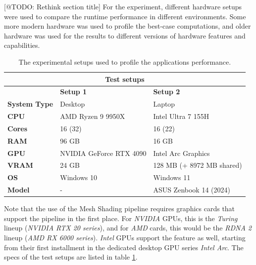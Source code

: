 [@TODO: Rethink section title]
For the experiment, different hardware setups were used to compare the runtime performance in different environments.
Some more modern hardware was used to profile the best-case computations, and older hardware was used for the results 
to different versions of hardware features and capabilities.

\begin{table}[h]          %
    \begin{tabular}{|lll|}
        \hline
        \multicolumn{3}{|c|}{\textbf{Test setups}}                                                                              \\ \hline
        \multicolumn{1}{|l|}{}                     & \multicolumn{1}{l|}{\textbf{Setup 1}}          & \textbf{Setup 2}          \\ \hline
        \multicolumn{1}{|l|}{\textbf{System Type}} & \multicolumn{1}{l|}{Desktop}                   & Laptop                    \\
        \multicolumn{1}{|l|}{\textbf{CPU}}         & \multicolumn{1}{l|}{AMD Ryzen 9 9950X}         & Intel Ultra 7 155H        \\
        \multicolumn{1}{|l|}{\textbf{Cores}}       & \multicolumn{1}{l|}{16 (32)}                   & 16 (22)                   \\
        \multicolumn{1}{|l|}{\textbf{RAM}}         & \multicolumn{1}{l|}{96 GB}                     & 16 GB                     \\
        \multicolumn{1}{|l|}{\textbf{GPU}}         & \multicolumn{1}{l|}{NVIDIA GeForce RTX 4090}   & Intel Arc Graphics        \\
        \multicolumn{1}{|l|}{\textbf{VRAM}}        & \multicolumn{1}{l|}{24 GB}                     & 128 MB (+ 8972 MB shared) \\
        \multicolumn{1}{|l|}{\textbf{OS}}          & \multicolumn{1}{l|}{Windows 10}                & Windows 11                \\
        \multicolumn{1}{|l|}{\textbf{Model}}       & \multicolumn{1}{l|}{-}                         & ASUS Zenbook 14 (2024)    \\ \hline
    \end{tabular}
    \caption{The experimental setups used to profile the applications performance.}
    \label{tbl:hardware-setup}
\end{table}

\noindent
Note that the use of the Mesh Shading pipeline requires graphics cards that support the pipeline in the first place. 
For \emph{NVIDIA} \ac{GPU}s, this is the \emph{Turing} lineup (\emph{NVIDIA RTX 20 series}), and for \emph{AMD} cards, 
this would be the \emph{RDNA 2} lineup (\emph{AMD RX 6000 series}). \emph{Intel} \ac{GPU}s support the feature as 
well, starting from their first installment in the dedicated desktop \ac{GPU} series \emph{Intel Arc}. The specs of 
the test setups are listed in table \ref{tbl:hardware-setup}. \\


